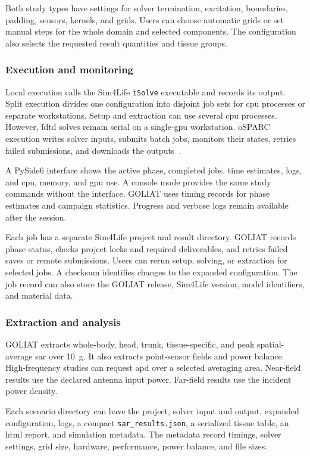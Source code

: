 \documentclass[final,5p,times,twocolumn]{elsarticle}
\begin{document}
Both study types have settings for solver termination, excitation, boundaries, padding, sensors, kernels, and grids. Users can choose automatic grids or set manual steps for the whole domain and selected components. The configuration also selects the requested result quantities and tissue groups.

\subsubsection{Execution and monitoring}

Local execution calls the Sim4Life \texttt{iSolve} executable and records its output. Split execution divides one configuration into disjoint job sets for \gls{cpu} processes or separate workstations. Setup and extraction can use several \gls{cpu} processes. However, \gls{fdtd} solves remain serial on a single-\gls{gpu} workstation. oSPARC execution writes solver inputs, submits batch jobs, monitors their states, retries failed submissions, and downloads the outputs~\cite{oSPARC}.

A PySide6 interface shows the active phase, completed jobs, time estimates, logs, and \gls{cpu}, memory, and \gls{gpu} use. A console mode provides the same study commands without the interface. GOLIAT uses timing records for phase estimates and campaign statistics. Progress and verbose logs remain available after the session.

Each job has a separate Sim4Life project and result directory. GOLIAT records phase status, checks project locks and required deliverables, and retries failed saves or remote submissions. Users can rerun setup, solving, or extraction for selected jobs. A checksum identifies changes to the expanded configuration. The job record can also store the GOLIAT release, Sim4Life version, model identifiers, and material data.

\subsubsection{Extraction and analysis}

GOLIAT extracts whole-body, head, trunk, tissue-specific, and peak spatial-average \gls{sar} over 10~g. It also extracts point-sensor fields and power balance. High-frequency studies can request \gls{apd} over a selected averaging area. Near-field results use the declared antenna input power. Far-field results use the incident power density.

Each scenario directory can have the project, solver input and output, expanded configuration, logs, a compact \texttt{sar\_results.json}, a serialized tissue table, an \gls{html} report, and simulation metadata. The metadata record timings, solver settings, grid size, hardware, performance, power balance, and file sizes.
\end{document}
